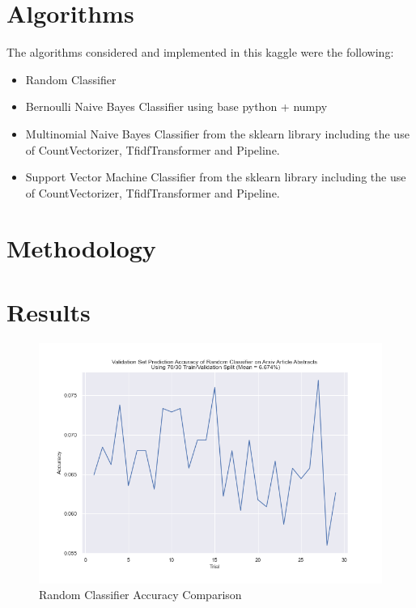 \documentclass[a4paper,12pt]{article}
\begin{document}
\section{Algorithms}

The algorithms considered and implemented in this kaggle were the following:
\begin{itemize}
    \item Random Classifier
    \item Bernoulli Naive Bayes Classifier using base python + numpy
    \item Multinomial Naive Bayes Classifier from the sklearn library including the use of CountVectorizer, TfidfTransformer and Pipeline.
    \item Support Vector Machine Classifier from the sklearn library including the use of CountVectorizer, TfidfTransformer and Pipeline.
\end{itemize}

\section{Methodology}



\section{Results}

\begin{figure}[H]
    \centering
    \caption{Random Classifier Accuracy Comparison}
    \includegraphics[width=12cm]{compareRandom.png}    
\end{figure}
\end{document}
